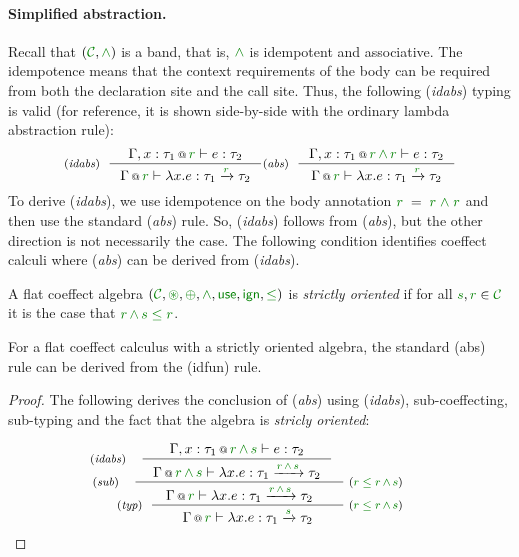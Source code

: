 \paragraph{Simplified abstraction.}
Recall that $(\C, \czip)$ is a band, that is, $\czip$  is idempotent and associative. The 
idempotence means that the context requirements of the body can be required from both the 
declaration site and the call site. Thus, the following (\emph{idabs}) typing is valid 
(for reference, it is shown side-by-side with the ordinary lambda abstraction rule):
%
\begin{equation*}
\tyrule{idabs}
  {\coctx{\Gamma, x:\tau_1}{\cclrd{r}} \vdash e : \tau_2}
  {\coctx{\Gamma}{\cclrd{r}} \vdash \lambda x.e : \tau_1 \xrightarrow{\cclrd{r}} \tau_2 }
\tyrule{abs}
  {\coctx{\Gamma, x:\tau_1}{\cclrd{r}\,\czip\,\cclrd{r}} \vdash e : \tau_2}
  {\coctx{\Gamma}{\cclrd{r}} \vdash \lambda x.e : \tau_1 \xrightarrow{\cclrd{r}} \tau_2 }
\end{equation*}
% 
To derive (\emph{idabs}), we use idempotence on the body annotation $\cclrd{r}\;=\;\cclrd{r}\;\czip\;\cclrd{r}$
and then use the standard (\emph{abs}) rule. So, (\emph{idabs}) follows from (\emph{abs}), 
but the other direction is not necessarily the case. The following condition identifies 
coeffect calculi where (\emph{abs}) can be derived from (\emph{idabs}).

\begin{definition}
A flat coeffect algebra $(\C, \cseq, \cpar, \czip, \cunit, \czero, \cleq)$ is \emph{strictly oriented} if for all
$\cclrd{s}, \cclrd{r} \in \C$ it is the case that $\cclrd{r} \,\czip\, \cclrd{s} \;\cleq\; \cclrd{r}$.
\end{definition}

\begin{remark}
\label{thm:flat-alt-abs}
For a flat coeffect calculus with a strictly oriented algebra, the standard (abs) rule can 
be derived from the (idfun) rule.
\end{remark}
\begin{proof}
The following derives the conclusion of (\emph{abs}) using (\emph{idabs}), sub-coeffecting, 
sub-typing and the fact that the algebra is \emph{stricly oriented}:

\begin{equation*}
\tyrule{typ}
  {\hspace{-5em} \tyrule{sub}
     {\hspace{-4em} \tyrule{idabs}  
        {\coctx{\Gamma, x:\tau_1}{\cclrd{r} \,\czip\, \cclrd{s}} \vdash e : \tau_2}
        {\coctx{\Gamma}{\cclrd{r} \,\czip\, \cclrd{s}} \vdash \lambda x.e : \tau_1 \xrightarrow{\cclrd{r} \,\czip\, \cclrd{s}} \tau_2 } }
     {\coctx{\Gamma}{\cclrd{r}} \vdash \lambda x.e : \tau_1 \xrightarrow{\cclrd{r} \,\czip\, \cclrd{s}} \tau_2} \;
           \textnormal{\footnotesize{($\cclrd{r} \;\cleq\; \cclrd{r} \,\czip\, \cclrd{s}$)}} \hspace{-5em} }
  {\coctx{\Gamma}{\cclrd{r}} \vdash \lambda x.e : \tau_1 \xrightarrow{\cclrd{s}} \tau_2} \; 
           \textnormal{\footnotesize{($\cclrd{r} \;\cleq\; \cclrd{r} \,\czip\, \cclrd{s}$)}}
\end{equation*}
\end{proof}

